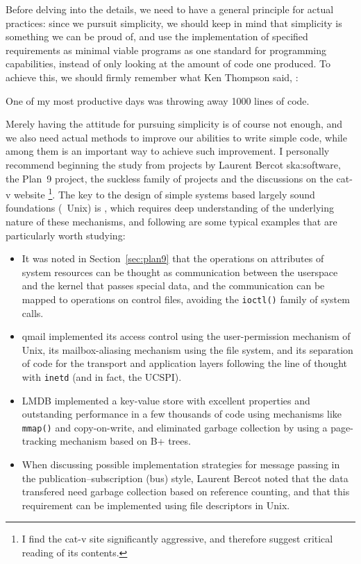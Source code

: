 Before delving into the details, we need to have a general principle for
actual practices: since we pursuit simplicity, we should keep in mind that
simplicity is something we can be proud of, and use the implementation of
specified requirements as minimal viable programs
as one standard for programming capabilities, instead of only looking
at the amount of code one produced.  To achieve this, we should firmly
remember what Ken Thompson said, :
\begin{quoting}
	One of my most productive days was throwing away 1000 lines of code.
\end{quoting}
Merely having the attitude for pursuing simplicity is of course not enough, and
we also need actual methods to improve our abilities to write simple code, while
among them  is an important way to achieve such improvement.  I personally
recommend beginning the study from projects by Laurent Bercot\cupercite%
{ska:software}, the Plan~9 project, the suckless family
of projects and the discussions on the cat-v website%
\footnote{I find the cat-v site significantly aggressive,
and therefore suggest critical reading of its contents.}.  The key to
the design of simple systems based largely sound foundations (\eg~Unix)
is , which requires deep
understanding of the underlying nature of these mechanisms, and following
are some typical examples that are particularly worth studying:
\begin{itemize}
\item It was noted in Section~\ref{sec:plan9} that the operations on
	attributes of system resources can be thought as communication
	between the userspace and the kernel that passes special data,
	and the communication can be mapped to operations on control
	files, avoiding the \verb|ioctl()| family of system calls.
\item qmail implemented its access control
	using the user-permission mechanism of Unix, its mailbox-aliasing
	mechanism using the file system, and its separation of code for the
	transport and application layers following the line of thought with
	\verb|inetd| (and in fact, the UCSPI).
\item LMDB implemented a key-value store with excellent
	properties and outstanding performance in a few thousands of code using
	mechanisms like \verb|mmap()| and copy-on-write, and eliminated garbage
	collection by using a page-tracking mechanism based on B+ trees.
\item When discussing possible implementation strategies for message
	passing in the publication--subscription (bus) style, Laurent Bercot
	noted that the data transfered need garbage
	collection based on reference counting, and that this requirement
	can be implemented using file descriptors in Unix.
\end{itemize}

